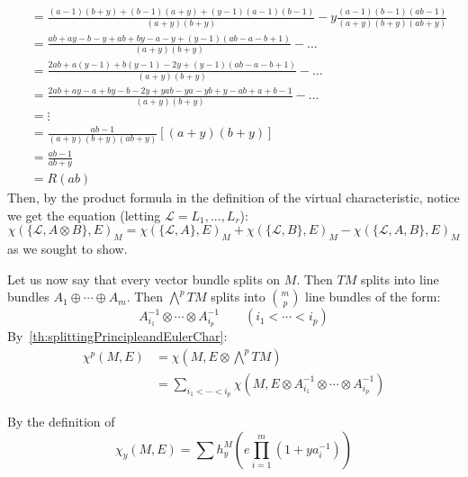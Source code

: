 \documentclass{ut-thesis}
\newenvironment{Proof}[1][]
  {\begin{ProofTcb}[#1]}
  {\end{ProofTcb}}
\newcommand{\CL}{{\mathcal{L}}}
\begin{document}
\begin{Proof}
\begin{align*}
  &= \frac{(a-1)(b+y) + (b-1)(a+y) + (y-1)(a-1)(b-1)}{(a+y)(b+y)} - y \frac{(a-1)(b-1)(ab-1)}{(a+y)(b+y)(ab+y)} \\
  &= \frac{ab+ay-b-y + ab+by-a-y + (y-1)(ab-a-b+1)}{(a+y)(b+y)} - \dots \\
  &= \frac{2ab+a(y-1)+b(y-1)-2y + (y-1)(ab-a-b+1)}{(a+y)(b+y)} - \dots \\
  &= \frac{2ab+ay-a+by-b-2y + yab-ya-yb+y-ab+a+b-1}{(a+y)(b+y)} - \dots \\
  &= \vdots\\
  &= \frac{ab-1}{(a+y)(b+y)(ab+y)} \left[ (a+y)(b+y) \right] \\
  &= \frac{ab-1}{ab+y} \\
  &= R(ab)
  \end{align*}
  Then, by the product formula in the definition of the virtual characteristic, notice we get the equation (letting $\CL = L_1, ..., L_r$):
\[
  \chi(\{\CL, A\otimes B\}, E)_M = \chi(\{\CL,A\}, E)_M + \chi(\{\CL, B\}, E)_M - \chi(\{\CL, A,B\}, E)_M
\]
  as we sought to show.
\end{Proof}

Let us now say that every vector bundle splits on $M$. Then $TM$ splits into line bundles $A_1\oplus \cdots
\oplus A_m$. Then $\bigwedge^p TM$ splits into $\binom{m}{p}$ line bundles of the form:
\[
  A_{i_1}^{-1}\otimes \cdots \otimes A_{i_p}^{-1} \qquad (i_1 < \cdots < i_p)
\]
By~\cref{th:splittingPrincipleandEulerChar}:
\begin{align*}
  \chi^p(M, E) &= \chi(M, E\otimes \bigwedge^p TM)\\
               &= \sum_{i_1 < \cdots < i_p} \chi(M, E\otimes A_{i_1}^{-1}\otimes \cdots \otimes A_{i_p}^{-1})
\end{align*}

  By the definition of
\[
  \chi_y(M, E) = \sum h_y^M \left(e \prod_{i=1}^m (1+ya_i^{-1})\right)
\]
\end{document}
